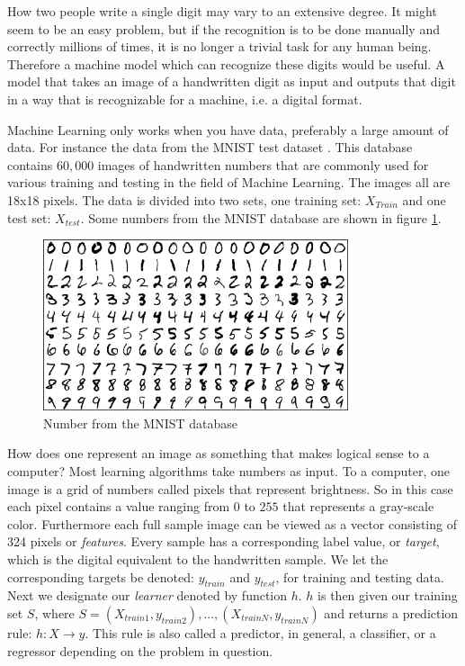 	How two people write a single digit may vary to an extensive degree. It might seem to be an easy problem, but if the recognition is to be done manually and correctly millions of times, it is no longer a trivial task for any human being. Therefore a machine model which can recognize these digits would be useful. A model that takes an image of a handwritten digit as input and outputs that digit in a way that is recognizable for a machine, i.e. a digital format.
	
	Machine Learning only works when you have data, preferably a large amount of data. For instance the data from the MNIST test dataset \cite{lecun1998gradient}. This database contains $60,000$ images of handwritten numbers that are commonly used for various training and testing in the field of Machine Learning. The images all are 18x18 pixels. The data is divided into two sets, one training set: $X_{Train}$ and one test set: $X_{test}$. Some numbers from the MNIST database are shown in figure \ref{fig:MNIST}.
	
\begin{figure}[ht]
    \centering
    \includegraphics[width=0.8\textwidth]{theory/figures/MNIST.png}
    \caption{Number from the MNIST database \cite{MNIST}}
    \label{fig:MNIST}
\end{figure}
	
	How does one represent an image as something that makes logical sense to a computer? Most learning algorithms take numbers as input. To a computer, one image is a grid of numbers called pixels that represent brightness. So in this case each pixel contains a value ranging from $0$ to $255$ that represents a gray-scale color. Furthermore each full sample image can be viewed as a vector consisting of 324 pixels or \textit{features}. Every sample has a corresponding label value, or \textit{target}, which is the digital equivalent to the handwritten sample. We let the corresponding targets be denoted: $y_{train}$ and $y_{test}$, for training and testing data. Next we designate our \textit{learner} denoted by function $h$. $h$ is then given our training set $S$, where $S = (X_{train1}, y_{train2}),..., (X_{trainN}, y_{trainN})$ and returns a prediction rule: $h: X \rightarrow y$. This rule is also called a predictor, in general, a classifier, or a regressor depending on the problem in question.
	
